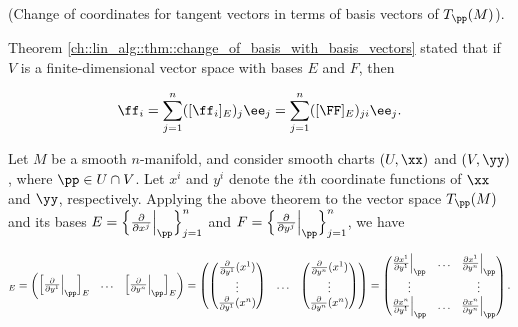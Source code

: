 \begin{theorem}
    (Change of coordinates for tangent vectors in terms of basis vectors of $T_\pp(M)$).

    Theorem \ref{ch::lin_alg::thm::change_of_basis_with_basis_vectors} stated that if $V$ is a finite-dimensional vector space with bases $E$ and $F$, then

    \begin{align*}
        \ff_i = \sum_{j = 1}^n ([\ff_i]_E)_j \ee_j = \sum_{j = 1}^n ([\FF]_E)_{ji} \ee_j.
    \end{align*}

    Let $M$ be a smooth $n$-manifold, and consider smooth charts $(U, \xx)$ and $(V, \yy)$, where $\pp \in U \cap V$. Let $x^i$ and $y^i$ denote the $i$th coordinate functions of $\xx$ and $\yy$, respectively. Applying the above theorem to the vector space $T_\pp(M)$ and its bases $E = \Big\{\frac{\pd}{\pd x^j}\Big|_\pp \Big\}_{j = 1}^n$ and $F = \Big\{\frac{\pd}{\pd y^j}\Big|_\pp \Big\}_{j = 1}^n$, we have
    
    \begin{align*}
        [\FF]_E
        = \begin{pmatrix} \Big[\frac{\pd}{\pd y^1}\Big|_\pp\Big]_E & \hdots & \Big[\frac{\pd}{\pd y^n}\Big|_\pp\Big]_E \end{pmatrix}
        =
        \begin{pmatrix}
            \begin{pmatrix}
                \frac{\pd}{\pd y^1}(x^1) \\ \vdots \\ \frac{\pd}{\pd y^1}(x^n)
            \end{pmatrix}
            &
            \hdots
            &
            \begin{pmatrix}
                \frac{\pd}{\pd y^n}(x^1) \\ \vdots \\ \frac{\pd}{\pd y^n}(x^n)
            \end{pmatrix}
        \end{pmatrix}
        =
        \begin{pmatrix}
            \frac{\pd x^1}{\pd y^1}\Big|_\pp & \hdots & \frac{\pd x^1}{\pd y^n}\Big|_\pp \\
            \vdots & & \vdots \\
            \frac{\pd x^n}{\pd y^1}\Big|_\pp & \hdots & \frac{\pd x^n}{\pd y^n}\Big|_\pp
        \end{pmatrix}.
    \end{align*}
    

\end{theorem}
